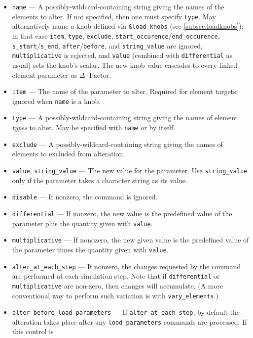 \documentclass[11pt]{article}
\begin{document}
\begin{itemize}
\item \verb|name| --- A possibly-wildcard-containing string giving the names of the
        elements to alter.  If not specified, then one must specify \verb|type|.
        May alternatively name a knob defined via \verb|&load_knobs| (see
        \ref{subsec:loadknobs}); in that case \verb|item|, \verb|type|,
        \verb|exclude|, \verb|start_occurence|/\verb|end_occurence|,
        \verb|s_start|/\verb|s_end|, \verb|after|/\verb|before|, and
        \verb|string_value| are ignored, \verb|multiplicative| is rejected,
        and \verb|value| (combined with \verb|differential| as usual) sets
        the knob's scalar.  The new knob value cascades to every linked
        element parameter as $\Delta\cdot\textrm{Factor}$.
\item \verb|item| --- The name of the parameter to alter.  Required for
        element targets; ignored when \verb|name| is a knob.
\item \verb|type| --- A possibly-wildcard-containing string giving the names of element
        {\em types} to alter.  May be specified with \verb|name| or by itself.
\item \verb|exclude| --- A possibly-wildcard-containing string giving the names of elements
        to excluded from alteration.
\item \verb|value|, \verb|string_value| --- The new value for the parameter.  Use
  \verb|string_value| only if the parameter takes a character string as its value.
\item \verb|disable| --- If nonzero, the command is ignored.
\item \verb|differential| --- If nonzero, the new value is 
        the predefined value of the parameter plus the quantity given with \verb|value|.
\item \verb|multiplicative| --- If nonozero, the new given value is the predefined
        value of the parameter times the quantity given with \verb|value|.
\item \verb|alter_at_each_step| --- If nonzero, the changes requested by the command are
  performed at each simulation step. Note that if \verb|differential| or \verb|multiplicative|
  are non-zero, then changes will accumulate. (A more conventional way to perform such variation
  is with \verb|vary_elements|.)
\item \verb|alter_before_load_parameters| --- If \verb|alter_at_each_step|, by default the
  alteration takes place after any \verb|load_parameters| commands are processed. If this control is

\end{itemize}
\end{document}
